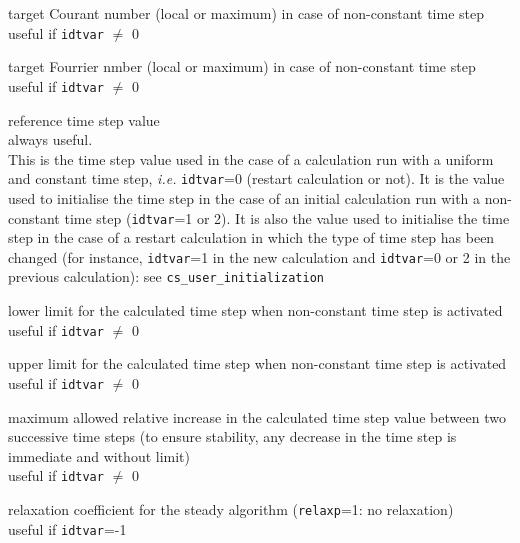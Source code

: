 {target Courant number (local or maximum) in case of non-constant time step\\
useful if {\tt idtvar} $\ne$ 0}

{target Fourrier nmber (local or maximum) in case of non-constant time step\\
useful if {\tt idtvar} $\ne$ 0}

{reference time step value\\
always useful.\\
This is the time step value used in the case of a calculation run with a
uniform and constant time step, {\em i.e.} {\tt idtvar}=0 (restart calculation
or not). It is the value used to initialise the time step in the case of
an initial calculation run with a non-constant time step
({\tt idtvar}=1 or 2). It is also the value used to initialise the time step
in the case of a restart calculation in which the type of
time step has been changed (for instance, {\tt idtvar}=1 in the new
calculation and {\tt idtvar}=0 or 2 in the previous calculation): see
\texttt{cs\_user\_initialization}}

{lower limit for the calculated time step when non-constant time step is activated\\
useful if {\tt idtvar} $\ne$ 0}

{upper limit for the calculated time step when non-constant time step is activated\\
useful if {\tt idtvar} $\ne$ 0}

{maximum allowed relative increase in the calculated time step value
between two successive time steps (to ensure stability, any decrease in the time step
is immediate and without limit)\\
useful if {\tt idtvar} $\ne$ 0}

{relaxation coefficient for the steady algorithm
 ({\tt relaxp}=1: no relaxation)\\
useful if {\tt idtvar}=-1}

